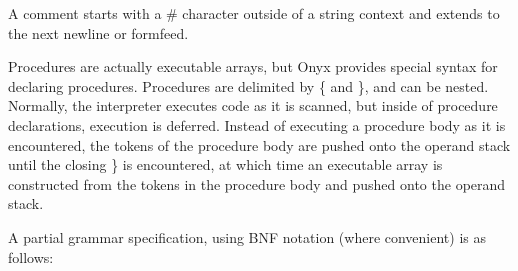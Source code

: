 A comment starts with a \# character outside of a string context and extends to
the next newline or formfeed.

Procedures are actually executable arrays, but Onyx provides special syntax for
declaring procedures.  Procedures are delimited by \{ and \}, and can be
nested.  Normally, the interpreter executes code as it is scanned, but inside of
procedure declarations, execution is deferred.  Instead of executing a procedure
body as it is encountered, the tokens of the procedure body are pushed onto the
operand stack until the closing \} is encountered, at which time an executable
array is constructed from the tokens in the procedure body and pushed onto the
operand stack.

A partial grammar specification, using BNF notation (where convenient) is as
follows:

